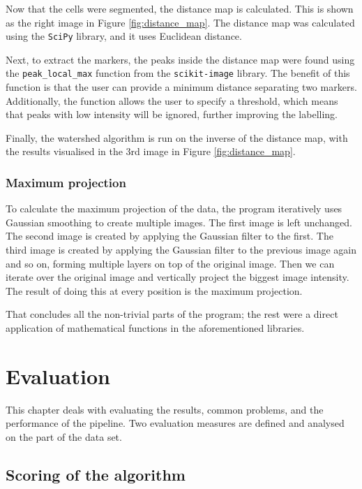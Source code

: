 \documentclass[
  digital,     %
  oneside,     %
  nosansbold,  %
  nocolorbold, %
  lof,         %
  lot,         %
]{fithesis4}
\begin{document}
Now that the cells were segmented, the distance map is calculated. This is shown
as the right image in Figure \ref{fig:distance_map}. The distance map was
calculated using the \texttt{SciPy} library, and it uses Euclidean distance.

Next, to extract the markers, the peaks inside the distance map were found using
the \texttt{peak\_local\_max} function from the \texttt{scikit-image} library. The benefit of
this function is that the user can provide a minimum distance separating two
markers. Additionally, the function allows the user to specify a threshold, which
means that peaks with low intensity will be ignored, further improving the
labelling.

Finally, the watershed algorithm is run on the inverse of the distance map, with the results
visualised in the 3rd image in Figure \ref{fig:distance_map}.

\subsection{Maximum projection} 
\label{sec:max-proj}
To calculate the maximum projection of the data, the program iteratively uses
Gaussian smoothing to create multiple images. The first image is left unchanged.
The second image is created by applying the Gaussian filter to the first. The
third image is created by applying the Gaussian filter to the previous image
again and so on, forming multiple layers on top of the original image. Then we can
iterate over the original image and vertically project the biggest image intensity.
The result of doing this at every position is the maximum projection.

That concludes all the non-trivial parts of the program; the rest were a direct
application of mathematical functions in the aforementioned libraries.

\chapter{Evaluation}
\label{chp:evaluation}
This chapter deals with evaluating the results, common problems, and the
performance of the pipeline. Two evaluation measures are defined and analysed on the part of
the data set.

\section{Scoring of the algorithm}
\end{document}
